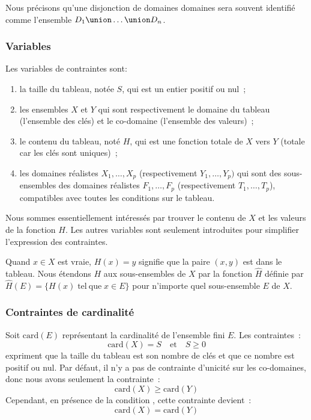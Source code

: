 Nous précisons qu'une disjonction de domaines domaines  sera souvent identifié comme l'ensemble $D_1 \union \dots \union D_n$.

\subsubsection{Variables}

Les variables de contraintes sont:
%
\begin{enumerate}

\item la taille du tableau, notée $S$, qui est un entier positif ou nul~;

\item les ensembles $X$ et $Y$ qui sont respectivement le domaine du tableau
(l'ensemble des clés) et le co-domaine (l'ensemble des valeurs)~;

\item le contenu du tableau, noté $H$, qui est une fonction totale de $X$ vers
$Y$ (totale car les clés sont uniques)~;

\item les domaines réalistes $X_1, \dots, X_p$ (respectivement $Y_1, \dots,
Y_p)$ qui sont des sous-ensembles des domaines réalistes $F_1, \dots, F_p$
(respectivement $T_1, \dots, T_p$), compatibles avec toutes les conditions sur
le tableau.

\end{enumerate}

Nous sommes essentiellement intéressés par trouver le contenu de $X$ et les
valeurs de la fonction $H$. Les autres variables sont seulement introduites pour
simplifier l'expression des contraintes.

Quand $x \in X$ est vraie, $H(x) = y$ signifie que la paire $(x, y)$ est dans le
tableau. Nous étendons $H$ aux sous-ensembles de $X$ par la fonction $\hat{H}$
définie par $\hat{H}(E) = \{H(x) \;\mathrm{tel~que}\; x \in E\}$ pour
n'importe quel sous-ensemble $E$ de $X$.

\subsubsection{Contraintes de cardinalité}

Soit $\mathrm{card}(E)$ représentant la cardinalité de l'ensemble fini $E$. Les
contraintes~:
%
$$\mathrm{card}(X) = S \quad\mathrm{et}\quad S \geq 0$$
%
expriment que la taille du tableau est son nombre de clés et que ce nombre est
positif ou nul. Par défaut, il n'y a pas de contrainte d'unicité sur les
co-domaines, donc nous avons seulement la contrainte~:
%
$$\mathrm{card}(X) \geq \mathrm{card}(Y)$$
%
Cependant, en présence de la condition , cette contrainte
devient~:
%
$$\mathrm{card}(X) = \mathrm{card}(Y)$$


